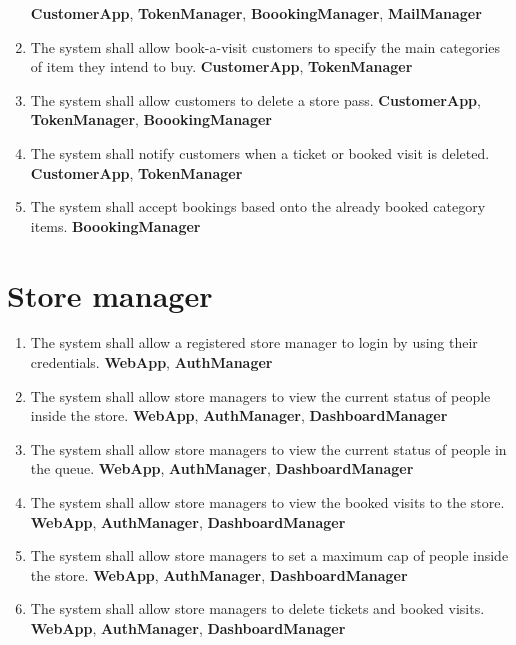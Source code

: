\begin{enumerate}[series=requirements, label=\textbf{R.\arabic*}]
	\newline\textbf{CustomerApp}, \textbf{TokenManager}, \textbf{BoookingManager}, \textbf{MailManager}
	\item The system shall allow book-a-visit customers to specify the main categories of item they intend to buy.
	\newline\textbf{CustomerApp}, \textbf{TokenManager}
	\item The system shall allow customers to delete a store pass.
	\newline\textbf{CustomerApp}, \textbf{TokenManager}, \textbf{BoookingManager}
	\item The system shall notify customers when a ticket or booked visit is deleted.
	\newline\textbf{CustomerApp}, \textbf{TokenManager}
	\item The system shall accept bookings based onto the already booked category items.
	\newline\textbf{BoookingManager}
\end{enumerate}

\section{Store manager}
\begin{enumerate}[resume*=requirements]
	\item The system shall allow a registered store manager to login by using their credentials.
	\newline\textbf{WebApp}, \textbf{AuthManager}
	\item The system shall allow store managers to view the current status of people inside the store.
	\newline\textbf{WebApp}, \textbf{AuthManager}, \textbf{DashboardManager}
	\item The system shall allow store managers to view the current status of people in the queue.
	\newline\textbf{WebApp}, \textbf{AuthManager}, \textbf{DashboardManager}
	\item The system shall allow store managers to view the booked visits to the store.
	\newline\textbf{WebApp}, \textbf{AuthManager}, \textbf{DashboardManager}
	\item The system shall allow store managers to set a maximum cap of people inside the store.
	\newline\textbf{WebApp}, \textbf{AuthManager}, \textbf{DashboardManager}
	\item The system shall allow store managers to delete tickets and booked visits.
	\newline\textbf{WebApp}, \textbf{AuthManager}, \textbf{DashboardManager}
\end{enumerate}

